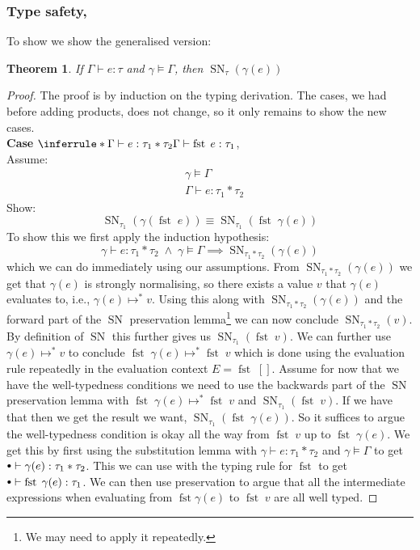 \documentclass[a4paper,10pt,fleqn]{article}
\DeclareMathOperator{\SNPred}{SN}
\DeclareMathOperator{\fst}{fst}
\newcommand{\evalto}{\ensuremath{\mapsto}}
\newcommand{\evaltos}[1][*]{\ensuremath{\evalto^{#1}}}
\newcommand{\mtenv}{{\raisebox{1.5pt}{$\scriptstyle\bullet$}}}
\newcommand{\case}[1]{~\\{\bf Case} #1,~\\}
\newcommand{\SN}[2]{\ensuremath{\SNPred_{#1}(#2)}}
\newcommand{\pand}{\ensuremath{\; \wedge \;}}
\newcommand*{\circled}[1]{\tikz[baseline=(char.base)]{
            \node[shape=circle,draw,inner sep=2pt] (char) {#1};}}
\newcommand{\TFst}{\ensuremath{
    \inferrule*{\Gamma \vdash e : \tau_1 * \tau_2}
               {\Gamma \vdash \fst \; e : \tau_1}}}
\newtheorem*{theorem}{Theorem}
\begin{document}
\subsubsection*{Type safety, \circled{a}}
To show \circled{a} we show the generalised version:
\begin{theorem}
  If $\Gamma \vdash e : \tau$ and $\gamma \models \Gamma$, then $\SN{\tau}{\gamma(e)}$
\end{theorem}
\begin{proof}
  The proof is by induction on the typing derivation. The cases, we had before adding products, does not change, so it only remains to show the new cases.
  \case{\TFst}
  Assume:
  \begin{align*}
    & \gamma \models \Gamma \\
    & \Gamma \vdash e : \tau_1 * \tau_2
  \end{align*}
  Show:
  \[
  \SN{\tau_1}{\gamma(\fst \; e)} \equiv \SN{\tau_1}{\fst \; \gamma(e)}
  \]
  To show this we first apply the induction hypothesis:
  \[
    \gamma \vdash e : \tau_1 * \tau_2 \pand \gamma \models \Gamma \implies \SN{\tau_1*\tau_2}{\gamma(e)}
  \]
  which we can do immediately using our assumptions. From $\SN{\tau_1*\tau_2}{\gamma(e)}$ we get that $\gamma(e)$ is strongly normalising, so there exists a value $v$ that $\gamma(e)$ evaluates to, i.e., $\gamma(e) \evaltos v$. Using this along with $\SN{\tau_1*\tau_2}{\gamma(e)}$ and the forward part of the $\SNPred$ preservation lemma\footnote{We may need to apply it repeatedly.} we can now conclude $\SN{\tau_1*\tau_2}{v}$. By definition of $\SNPred$ this further gives us $\SN{\tau_1}{\fst \; v}$. We can further use $\gamma(e) \evaltos v$ to conclude $\fst \; \gamma(e) \evaltos \fst \; v$ which is done using the evaluation rule repeatedly in the evaluation context $E=\fst \; []$. Assume for now that we have the well-typedness conditions we need to use the backwards part of the $\SNPred$ preservation lemma with $\fst \; \gamma(e) \evaltos \fst \; v$ and $\SN{\tau_1}{\fst \; v}$. If we have that then we get the result we want, $\SN{\tau_1}{\fst \; \gamma(e)}$. So it suffices to argue the well-typedness condition is okay all the way from $\fst \; v$ up to $\fst \; \gamma(e)$. We get this by first using the substitution lemma with $\gamma \vdash e : \tau_1 * \tau_2$ and $\gamma \models \Gamma$ to get $\mtenv \vdash \gamma(e) : \tau_1 * \tau_2$. This we can use with the typing rule for $\fst$ to get $\mtenv \vdash \fst \; \gamma(e) : \tau_1$. We can then use preservation to argue that all the intermediate expressions when evaluating from $\fst \gamma(e)$ to $\fst \; v$ are all well typed.

\end{proof}
\end{document}
